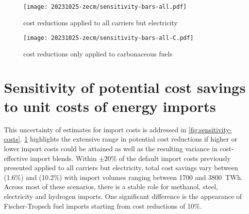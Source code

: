 \begin{figure*}
    \begin{subfigure}[t]{\columnwidth}
        \caption{cost reductions applied to all carriers but electricity}
        \label{fig:sensitivity-costs:A}
        \texttt{[image: 20231025-zecm/sensitivity-bars-all.pdf]}
    \end{subfigure}
    \begin{subfigure}[t]{\columnwidth}
        \caption{cost reductions only applied to carbonaceous fuels}
        \label{fig:sensitivity-costs:B}
        \texttt{[image: 20231025-zecm/sensitivity-bars-all-C.pdf]}
    \end{subfigure}
    \caption{\textbf{Effect of import cost variations on cost savings and import shares.}
    In panel (a), indicated relative cost changes are applied uniformly to all vectors but electricity imports.
    In panel (b), cost changes are only applied to carbonaceous fuels (methane, methanol and Fischer-Tropsch).
    Top subpanels show potential cost savings compared to the scenario with full self-sufficiency.
    Bottom subpanels show the share and composition of different import vectors in relation to total energy system costs.
    }
    \label{fig:sensitivity-costs}
\end{figure*}

\section*{Sensitivity of potential cost savings to unit costs of energy imports}

This uncertainty of estimates for import costs is addressed in
\cref{fig:sensitivity-costs}. \cref{fig:sensitivity-costs:A} highlights the
extensive range in potential cost reductions if higher or lower import costs
could be attained as well as the resulting variance in cost-effective import
blends. Within $\pm 20\%$ of the default import costs previously presented
applied to all carriers but electricity, total cost savings vary between
 (1.6\%) and  (10.2\%) with import volumes ranging between
1700 and 3800~TWh. Across most of these scenarios, there is a stable role for
methanol, steel, electricity and hydrogen imports. One significant difference is
the appearance of Fischer-Tropsch fuel imports starting from cost reductions of
10\%.


